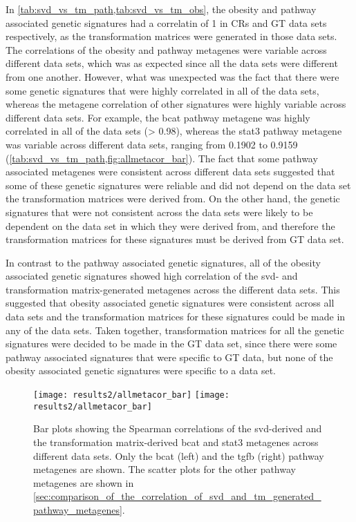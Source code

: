 In \cref{tab:svd_vs_tm_path,tab:svd_vs_tm_obs}, the obesity and pathway associated genetic signatures had a correlatin of 1 in CRs and GT data sets respectively, as the transformation matrices were generated in those data sets.
The correlations of the obesity and pathway metagenes were variable across different data sets, which was as expected since all the data sets were different from one another.
However, what was unexpected was the fact that there were some genetic signatures that were highly correlated in all of the data sets, whereas the metagene correlation of other signatures were highly variable across different data sets.
For example, the \gls{bcat} pathway metagene was highly correlated in all of the data sets (\textgreater{} 0.98), whereas the \gls{stat3} pathway metagene was variable across different data sets, ranging from 0.1902 to 0.9159 (\cref{tab:svd_vs_tm_path,fig:allmetacor_bar}).
The fact that some pathway associated metagenes were consistent across different data sets suggested that some of these genetic signatures were reliable and did not depend on the data set the transformation matrices were derived from.
On the other hand, the genetic signatures that were not consistent across the data sets were likely to be dependent on the data set in which they were derived from, and therefore the transformation matrices for these signatures must be derived from GT data set.

In contrast to the pathway associated genetic signatures, all of the obesity associated genetic signatures showed high correlation of the \gls{svd}- and transformation matrix-generated metagenes across the different data sets.
This suggested that obesity associated genetic signatures were consistent across all data sets and the transformation matrices for these signatures could be made in any of the data sets.
Taken together, transformation matrices for all the genetic  signatures were decided to be made in the GT data set, since there were some pathway associated signatures that were specific to GT data, but none of the obesity associated genetic signatures were specific to a data set.
\\

\begin{figure}[htpb]
	\centering
	\texttt{[image: results2/allmetacor\_bar]}
	\texttt{[image: results2/allmetacor\_bar]}
	\caption[Bar plots showing the Spearman correlation of the \gls{svd}- and TM-derived pathway metagenes across different data sets]{Bar plots showing the Spearman correlations of the \gls{svd}-derived and the transformation matrix-derived \gls{bcat} and \gls{stat3} metagenes across different data sets.
	Only the \gls{bcat} (left) and the \gls{tgfb}  (right) pathway metagenes are shown.
	The scatter plots for the other pathway metagenes are shown in \cref{sec:comparison_of_the_correlation_of_svd_and_tm_generated_pathway_metagenes}.
	}
	\label{fig:allmetacor_bar}
\end{figure}

